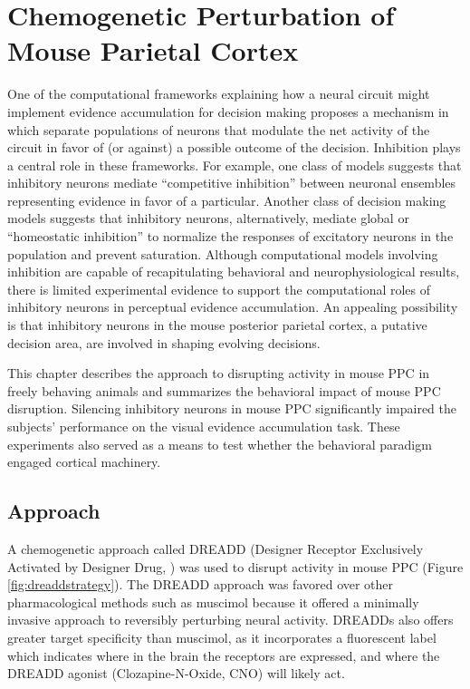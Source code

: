 
\chapter{Chemogenetic Perturbation of Mouse Parietal Cortex} %

\label{Chapter3} 

One of the computational frameworks explaining how a neural circuit might implement evidence accumulation for decision making proposes a mechanism in which separate populations of neurons that modulate the net activity of the circuit in favor of (or against) a possible outcome of the decision. Inhibition plays a central role in these frameworks. For example, one class of models \parencite{Wang2002,Usher2001,Machens2005,Brown2001} suggests that inhibitory neurons mediate “competitive inhibition” between neuronal ensembles representing evidence in favor of a particular. Another class of decision making models \parencite{Ma2006,Beck2008} suggests that inhibitory neurons, alternatively, mediate global or “homeostatic inhibition” to normalize the responses of excitatory neurons in the population and prevent saturation. Although computational models involving inhibition are capable of recapitulating behavioral and neurophysiological results, \parencite{Usher2001,Wang2002,Machens2005,Beck2008,Wong2007,Wong2006} there is limited experimental evidence to support the computational roles of inhibitory neurons in perceptual evidence accumulation. An appealing possibility is that inhibitory neurons in the mouse posterior parietal cortex, a putative decision area, are involved in shaping evolving decisions.\par 
This chapter describes the approach to disrupting activity in mouse PPC in freely behaving animals and summarizes the behavioral impact of mouse PPC disruption. Silencing inhibitory neurons in mouse PPC significantly impaired the subjects' performance on the visual evidence accumulation task. These experiments also served as a means to test whether the behavioral paradigm engaged cortical machinery.
\section{Approach}
A chemogenetic approach called DREADD (Designer Receptor Exclusively Activated by Designer Drug, \textcite{Rogan2011}) was used to disrupt activity in mouse PPC (Figure \ref{fig:dreaddstrategy}). The DREADD approach was favored over other pharmacological methods such as muscimol because it offered a minimally invasive approach to reversibly perturbing neural activity. DREADDs also offers greater target specificity than muscimol, as it incorporates a fluorescent label which indicates where in the brain the receptors are expressed, and where the DREADD agonist (Clozapine-N-Oxide, CNO) will likely act.\par 


